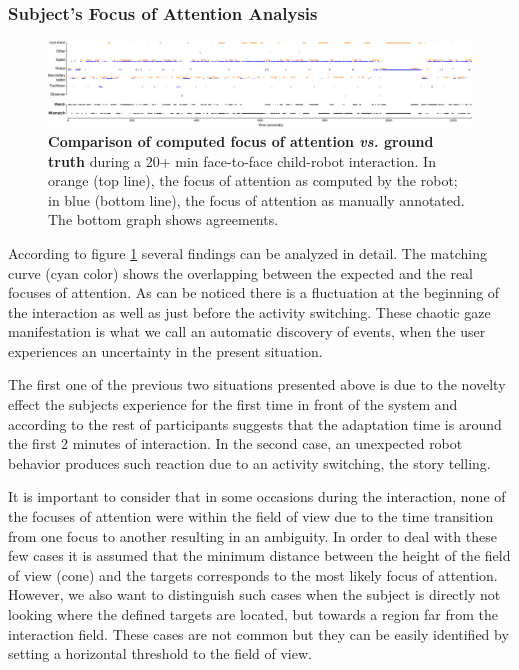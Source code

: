 \documentclass{sig-alternate}
\newcommand{\vs}{\textit{vs.}\xspace}
\begin{document}
\subsubsection{Subject's Focus of Attention Analysis}

\begin{figure}
    \centering
    \includegraphics[width=\linewidth]{matches}
    \caption{\small \textbf{Comparison of computed focus of attention \vs ground
        truth} during a 20+ min face-to-face child-robot interaction.
        In orange (top line), the focus of attention as computed by the robot;
        in blue (bottom line), the focus of attention as manually annotated. The
    bottom graph shows agreements.}

    \label{fig:realExpected}
    
\end{figure}

According to figure \ref{fig:realExpected} several findings can be analyzed in
detail. The matching curve (cyan color) shows the overlapping between the
expected and the real focuses of attention. As can be noticed there is a
fluctuation at the beginning of the interaction as well as just before the
activity switching. These chaotic gaze manifestation is what we call an
automatic discovery of events, when the user experiences an uncertainty in the
present situation. 

The first one of the previous two situations presented above is due to the
novelty effect the subjects experience for the first time in front of the system
and according to the rest of participants suggests that the adaptation time is
around the first 2 minutes of interaction. In the second case, an unexpected
robot behavior produces such reaction due to an activity switching, the story
telling.

It is important to consider that in some occasions during the interaction, none
of the focuses of attention were within the field of view due to the time
transition from one focus to another resulting in an ambiguity. In order to deal
with these few cases it is assumed that the minimum distance between the height
of the field of view (cone) and the targets corresponds to the most likely focus
of attention. However, we also want to distinguish such cases when the subject
is directly not looking where the defined targets are located, but towards a
region far from the interaction field. These cases are not common but they can
be easily identified by setting a horizontal threshold to the field of view.
\end{document}
